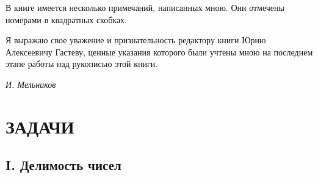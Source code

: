 \documentclass[12pt, a4paper, openany]{book}
\begin{document}
В книге имеется несколько примечаний, написанных мною. Они отмечены номерами в квадратных скобках.

Я выражаю свое уважение и признательность редактору книги Юрию Алексеевичу Гастеву, ценные указания которого были учтены мною на последнем этапе работы над рукописью этой книги.

	\begin{flushright}
	\textit{И. Мельников}
\end{flushright}
\newpage

	\section[Задачи]{\center ЗАДАЧИ}
	\subsection[I. Делимость чисел]{\center I. Делимость чисел}
\end{document}
